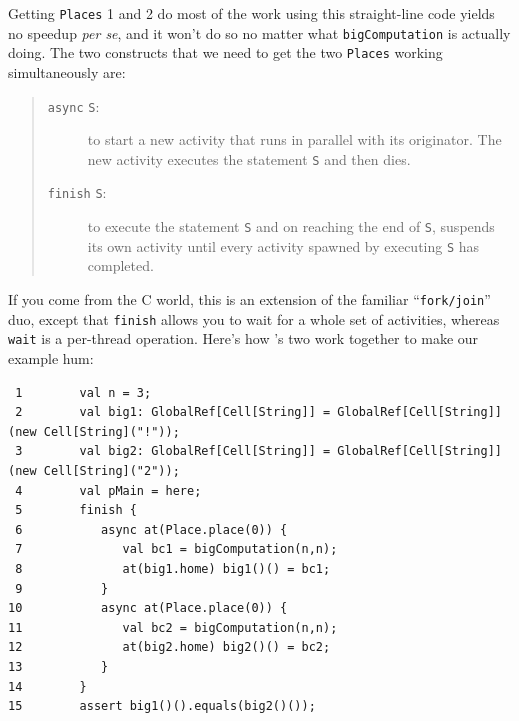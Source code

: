 Getting  {\tt Places} 1 and 2 do most of the work using this straight-line
code yields no
speedup {\em per se}, and it won't do so no
matter what {\tt bigComputation} is actually doing.  The two
constructs that we need to get the two {\tt Places} working simultaneously are:
\begin{quote}
\begin{description}
\item[ {\tt async} {\tt S}:] to start a new
activity that runs in parallel with its originator.  The new activity executes the
statement {\tt S} and then dies.
\item[{\tt finish} {\tt S}:] to execute the statement {\tt S} and on reaching the
end of {\tt S}, suspends its own activity until every activity spawned by
executing {\tt S} has completed.  
\end{description}
\end{quote}
If you come from the C world, this is an extension of the familiar ``{\tt fork/join}''
duo, except that {\tt finish} allows you to wait for a whole set of activities,
whereas {\tt wait} is a per-thread operation.
Here's how \Xten's two work together to make our example hum:
\begin{verbatim}
 1        val n = 3;
 2        val big1: GlobalRef[Cell[String]] = GlobalRef[Cell[String]](new Cell[String]("!"));
 3        val big2: GlobalRef[Cell[String]] = GlobalRef[Cell[String]](new Cell[String]("2"));
 4        val pMain = here;   
 5        finish { 
 6           async at(Place.place(0)) { 
 7              val bc1 = bigComputation(n,n);
 8              at(big1.home) big1()() = bc1; 
 9           }
10           async at(Place.place(0)) { 
11              val bc2 = bigComputation(n,n);
12              at(big2.home) big2()() = bc2; 
13           }
14        } 
15        assert big1()().equals(big2()()); 
\end{verbatim}

